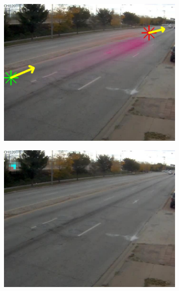 \begin{figure}
    \centering
        \begin{subfigure}{0.32\linewidth}
            \includegraphics[width=\linewidth]{./img/scene_learning/res/ILCHI_CHI120/ILCHI_CHI120_20151013_095039_099-0.jpg}
        \end{subfigure}
        \begin{subfigure}{0.32\linewidth}
            \includegraphics[width=\linewidth]{./img/scene_learning/res/ILCHI_CHI120/ILCHI_CHI120_20151013_095039_099-1.jpg}
        \end{subfigure}
                \begin{subfigure}{0.32\linewidth}

\end{subfigure}
\end{figure}
